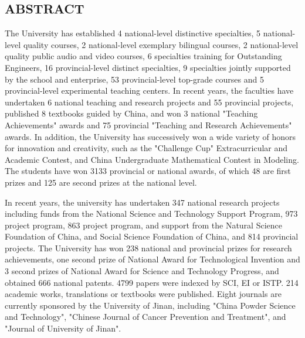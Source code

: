 \begin{ujnabstract*}
\section{ABSTRACT}
\begin{spacing}{1.4}\normalsize{
The University has established 4 national-level distinctive specialties,
5 national-level quality courses, 2 national-level exemplary bilingual courses,
2 national-level quality public audio and video courses,
6 specialties training for Outstanding Engineers, 16 provincial-level distinct specialties,
9 specialties jointly supported by the school and enterprise,
53 provincial-level top-grade courses and 5 provincial-level experimental teaching centers.
In recent years, the faculties have undertaken 6 national teaching and research projects and 55 provincial projects,
published 8 textbooks guided by China, and won 3 national "Teaching Achievements" awards and 75 provincial "Teaching and Research Achievements" awards.
In addition, the University has successively won a wide variety of honors for innovation and creativity,
such as the "Challenge Cup" Extracurricular and Academic Contest,
and China Undergraduate Mathematical Contest in Modeling.
The students have won 3133 provincial or national awards,
of which 48 are first prizes and 125 are second prizes at the national level.

In recent years, the university has undertaken 347 national research projects including funds from the National Science and Technology Support Program,
973 project program, 863 project program, and support from the Natural Science Foundation of China,
and Social Science Foundation of China, and 814 provincial projects.
The University has won 238 national and provincial prizes for research achievements,
one second prize of National Award for Technological Invention and 3 second prizes of National Award for Science and Technology Progress,
and obtained 666 national patents. 4799 papers were indexed by SCI, EI or ISTP. 214 academic works,
translations or textbooks were published. Eight journals are currently sponsored by the University of Jinan,
including "China Powder Science and Technology", "Chinese Journal of Cancer Prevention and Treatment",
and "Journal of University of Jinan".
}\end{spacing}
\begin{spacing}{0.9}
\small{}
\end{spacing}
\end{ujnabstract*}
